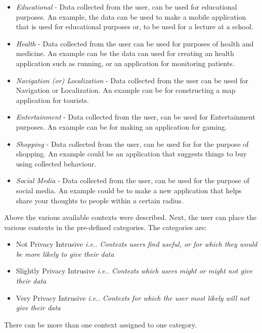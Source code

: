 \begin{itemize}
\item {\it Educational} - Data collected from the user, can be used for educational purposes. An example, the data can be used to make a mobile application that is used for educational purposes or, to be used for a lecture at a school.
\item {\it Health} - Data collected from the user can be used for purposes of health and medicine. An example can be the data
can used for creating an health application such as running, or an application for monitoring patients.
\item {\it Navigation (or) Localization} - Data collected from the user can be used for Navigation or Localization. An example can be
for constructing a map application for tourists.
\item {\it Entertainment} - Data collected from the user, can be used for Entertainment purposes. An example can be for making an application
for gaming.
\item {\it Shopping} - Data collected from the user, can be used for for the purpose of shopping. An example could be an application that
suggests things to buy using collected behaviour.
\item {\it Social Media} - Data collected from the user, can be used for the purpose of social media. An example could be to make a new application that helps share your thoughts to people within a certain radius.

\end{itemize}


Above the various available contexts were described. Next, the user can place the various contexts in the pre-defined categories. The categories
are:

\begin{itemize}
\item Not Privacy Intrusive {\it i.e.. Contexts users find useful, or for which they would be more likely to give their data}
\item Slightly Privacy Intrusive {\it i.e.. Contexts which users might or might not give their data}
\item Very Privacy Intrusive {\it i.e.. Contexts for which the user most likely will not give their data}

\end{itemize}

There can be more than one context assigned to one category.

